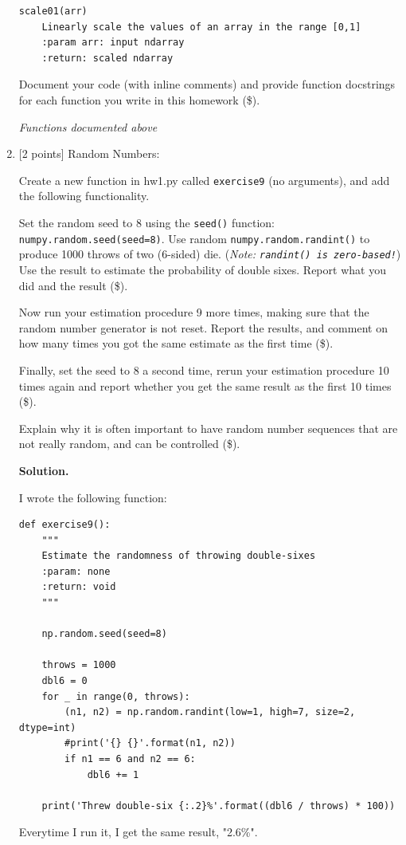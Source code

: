 \documentclass[10pt]{article}
\begin{document}
\begin{enumerate}
\begin{verbatim}
scale01(arr)
    Linearly scale the values of an array in the range [0,1]
    :param arr: input ndarray
    :return: scaled ndarray
\end{verbatim}

Document your code (with inline comments) and provide function docstrings for each function you write in this homework (\$).

\emph{Functions documented above}

\item \label{prob:9} [2 points]
Random Numbers:

Create a new function in hw1.py called {\tt exercise9} (no arguments), and add the following functionality.

Set the random seed to 8 using the {\tt seed()} function: {\tt numpy.random.seed(seed=8)}.  Use random {\tt numpy.random.randint()} to produce 1000 throws of two (6-sided) die.  ({\em Note: {\tt randint() is zero-based!}})  Use the result to estimate the probability of double sixes.  Report what you did and the result (\$).  

Now run your estimation procedure 9 more times, making sure that the random number generator is not reset.  Report the results, and comment on how many times you got the same estimate as the first time (\$).

Finally, set the seed to 8 a second time, rerun your estimation procedure 10 times again and report whether you get the same result as the first 10 times (\$).

Explain why it is often important to have random number sequences that are not really random, and can be controlled (\$).

{\bf Solution.} 

I wrote the following function:

\begin{verbatim}
def exercise9():
    """
    Estimate the randomness of throwing double-sixes
    :param: none
    :return: void
    """

    np.random.seed(seed=8)

    throws = 1000
    dbl6 = 0
    for _ in range(0, throws):
        (n1, n2) = np.random.randint(low=1, high=7, size=2, dtype=int)
        #print('{} {}'.format(n1, n2))
        if n1 == 6 and n2 == 6:
            dbl6 += 1

    print('Threw double-six {:.2}%'.format((dbl6 / throws) * 100))
\end{verbatim}

Everytime I run it, I get the same result, "2.6\%".


\end{enumerate}
\end{document}
